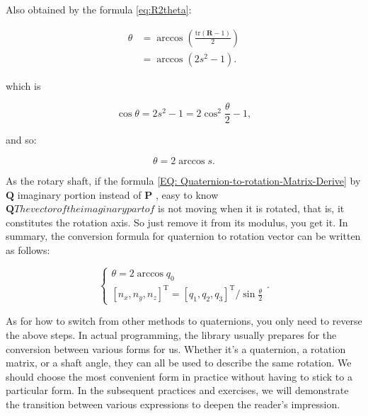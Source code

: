 Also obtained by the formula \eqref{eq:R2theta}:

\begin{equation}
\begin{aligned}
\theta &= \arccos(\frac{\mathrm{tr}(\bm{R}-1)}{2}) \\
&=\arccos(2s^2-1).
\end{aligned}
\end{equation}

which is

\begin{equation}
\cos \theta =2s^2-1=2 \cos^2 \frac{\theta}{2} -1,
\end{equation}

and so:

\begin{equation}
\theta = 2 \arccos s.
\end{equation}

As the rotary shaft, if the formula \eqref{EQ: Quaternion-to-rotation-Matrix-Derive} by $ \bm{Q} $ imaginary portion instead of $ \bm{P} $ , easy to know $ \bm{Q} The vector of the imaginary part of $ is not moving when it is rotated, that is, it constitutes the rotation axis. So just remove it from its modulus, you get it. In summary, the conversion formula for quaternion to rotation vector can be written as follows:

\begin{equation}
\label{eq:rotationVector2Quaternion}
\begin{cases}
\theta  = 2\arccos {q_0}\\
{\left[ {{n_x},{n_y},{n_z}} \right]^\mathrm{T}} = {{{\left[ {{q_1},{q_2},{q_3}} \right]}^\mathrm{T}}}/{\sin \frac{\theta }{2}}
\end{cases} .
\end{equation}

As for how to switch from other methods to quaternions, you only need to reverse the above steps. In actual programming, the library usually prepares for the conversion between various forms for us. Whether it's a quaternion, a rotation matrix, or a shaft angle, they can all be used to describe the same rotation. We should choose the most convenient form in practice without having to stick to a particular form. In the subsequent practices and exercises, we will demonstrate the transition between various expressions to deepen the reader's impression.



